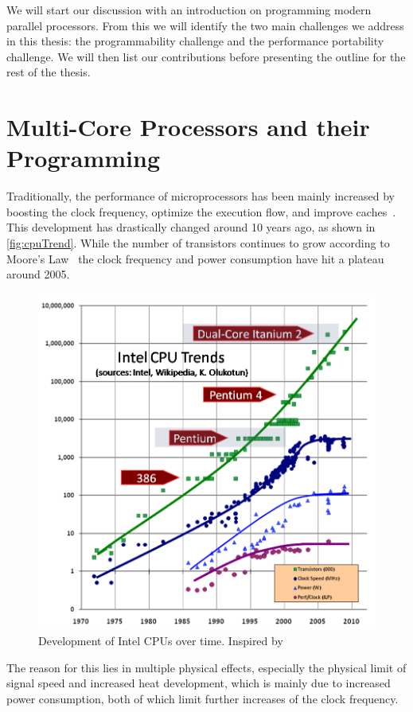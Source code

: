 \noindent
We will start our discussion with an introduction on programming modern parallel processors.
From this we will identify the two main challenges we address in this thesis:
the programmability challenge and the performance portability challenge.
We will then list our contributions before presenting the outline for the rest of the thesis.

\section{Multi-Core Processors and their Programming}

Traditionally, the performance of microprocessors has been mainly increased by boosting the clock frequency, optimize the execution flow, and improve caches~\cite{Sutter2005}.
This development has drastically changed around 10 years ago, as shown in \autoref{fig:cpuTrend}.
While the number of transistors continues to grow according to Moore's Law~\cite{Moore1998} the clock frequency and power consumption have hit a plateau around 2005.
\begin{figure}
  \centering
  \includegraphics[width=.9\linewidth]{Figures/CPUTrend.png}
  \caption{Development of Intel CPUs over time. Inspired by~\cite{Sutter2005}}
  \label{fig:cpuTrend}
\end{figure} 
The reason for this lies in multiple physical effects, especially the physical limit of signal speed and increased heat development, which is mainly due to increased power consumption, both of which limit further increases of the clock frequency.
